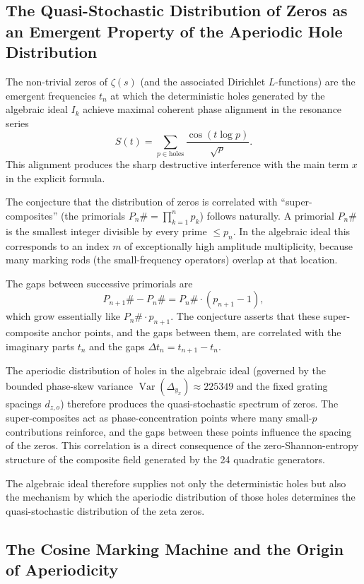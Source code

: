 \documentclass[11pt,a4paper]{article}
\begin{document}
\subsection{The Quasi-Stochastic Distribution of Zeros as an Emergent Property of the Aperiodic Hole Distribution}

The non-trivial zeros of \(\zeta(s)\) (and the associated Dirichlet \(L\)-functions) are the emergent frequencies \(t_n\) at which the deterministic holes generated by the algebraic ideal \(I_k\) achieve maximal coherent phase alignment in the resonance series
\[
S(t)=\sum_{p\in\text{holes}}\frac{\cos(t\log p)}{\sqrt{p}}.
\]
This alignment produces the sharp destructive interference with the main term \(x\) in the explicit formula.

The conjecture that the distribution of zeros is correlated with “super-composites” (the primorials \(P_n\# = \prod_{k=1}^n p_k\)) follows naturally. A primorial \(P_n\#\) is the smallest integer divisible by every prime \(\leq p_n\). In the algebraic ideal this corresponds to an index \(m\) of exceptionally high amplitude multiplicity, because many marking rods (the small-frequency operators) overlap at that location.

The gaps between successive primorials are
\[
P_{n+1}\# - P_n\# = P_n\# \cdot (p_{n+1}-1),
\]
which grow essentially like \(P_n\# \cdot p_{n+1}\). The conjecture asserts that these super-composite anchor points, and the gaps between them, are correlated with the imaginary parts \(t_n\) and the gaps \(\Delta t_n = t_{n+1}-t_n\).

The aperiodic distribution of holes in the algebraic ideal (governed by the bounded phase-skew variance \(\operatorname{Var}(\Delta_{y_x})\approx225349\) and the fixed grating spacings \(d_{z,o}\)) therefore produces the quasi-stochastic spectrum of zeros. The super-composites act as phase-concentration points where many small-\(p\) contributions reinforce, and the gaps between these points influence the spacing of the zeros. This correlation is a direct consequence of the zero-Shannon-entropy structure of the composite field generated by the 24 quadratic generators.

The algebraic ideal therefore supplies not only the deterministic holes but also the mechanism by which the aperiodic distribution of those holes determines the quasi-stochastic distribution of the zeta zeros.

\subsection{The Cosine Marking Machine and the Origin of Aperiodicity}
\end{document}
